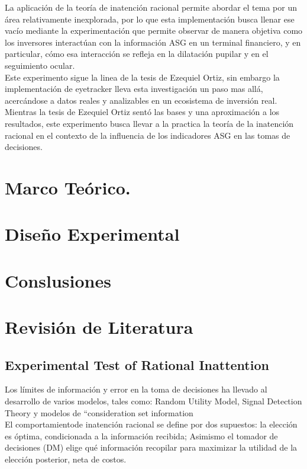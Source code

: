 \documentclass[11pt,letterpaper]{article}
\begin{document}
La aplicación de la teoría de inatención racional permite abordar el tema por un área relativamente inexplorada, por lo que esta implementación busca llenar ese vacío mediante la experimentación que permite observar de manera objetiva como los inversores interactúan con la información ASG en un terminal financiero, y en particular, cómo esa interacción se refleja en la dilatación pupilar y en el seguimiento ocular.\\

Este experimento sigue la linea de la tesis de Ezequiel Ortiz, sin embargo la implementación de eyetracker  lleva esta investigación un paso mas allá, acercándose a datos reales y analizables en un ecosistema de inversión real. Mientras la tesis de Ezequiel Ortiz sentó las bases y una aproximación a los resultados, este experimento busca llevar a la practica la teoría de la inatención racional en el contexto de la influencia de los indicadores ASG en las tomas de decisiones.


\section{Marco Teórico.}




\section{Diseño Experimental}



\section{Conslusiones}

\section{Revisión de Literatura}

\subsection{Experimental Test of Rational Inattention}

Los límites de información y error en la toma de decisiones ha llevado al desarrollo de varios modelos, tales como: Random Utility Model, Signal Detection Theory y modelos de “consideration set information\\

El comportamientode inatención racional se define por dos supuestos: la elección es óptima, condicionada a la información recibida; Asimismo el tomador de decisiones (DM) elige qué información recopilar para maximizar la utilidad de la elección posterior, neta de costos.\\
\end{document}
